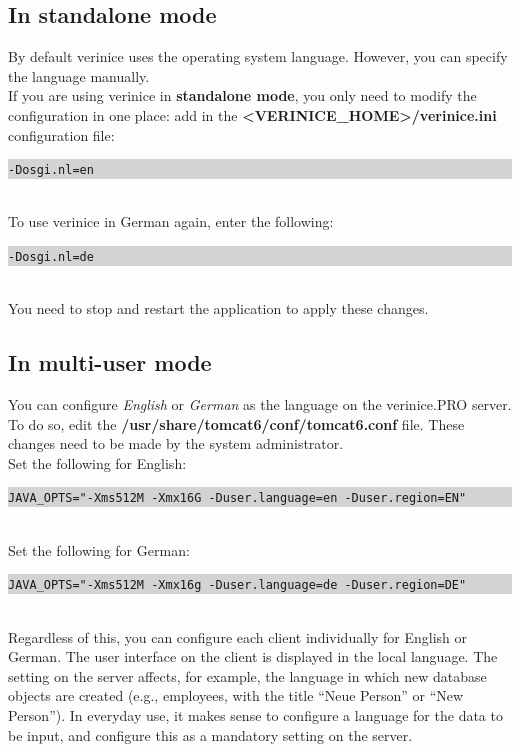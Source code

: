 \documentclass[a4paper,10pt]{book}
\begin{document}
\subsection{In standalone mode}
By default verinice uses the operating system language. However, you can specify the language manually.
\newline\\
If you are using verinice in \textbf{standalone mode}, you only need to modify the configuration in one place:
add in the
\newline \textbf{\textless VERINICE\_HOME\textgreater/verinice.ini} configuration file:
\newline\\
\colorbox{lightgray}{\parbox{\textwidth}{
{\tt -Dosgi.nl=en}
}}
\newline\\
To use verinice in German again, enter the following:
\newline\\
\colorbox{lightgray}{\parbox{\textwidth}{
{\tt -Dosgi.nl=de}
}}
\newline\\
You need to stop and restart the application to apply these changes.

\subsection{In multi-user mode}
You can configure {\em English} or {\em German} as the language on the verinice.\textsc{PRO} server.
To do so, edit the \textbf{/usr/share/tomcat6/conf/tomcat6.conf} file. These changes need to be made by the system administrator.
\newline\\
Set the following for English:
\newline\\
\colorbox{lightgray}{\parbox{\textwidth}{
{\tt JAVA\_OPTS="-Xms512M -Xmx16G -Duser.language=en -Duser.region=EN"}
}}
\newline\\
Set the following for German:
\newline\\
\colorbox{lightgray}{\parbox{\textwidth}{
{\tt JAVA\_OPTS="-Xms512M -Xmx16g -Duser.language=de -Duser.region=DE"}
}}
\newline\\
Regardless of this, you can configure each client individually for English or German.
The user interface on the client is displayed in the local language. The setting on the server affects,
for example, the language in which new database objects are created (e.g., employees, with the title
``Neue Person'' or ``New Person'').
\newline
In everyday use, it makes sense to configure a language for the data to be input, and configure this
as a mandatory setting on the server.
\end{document}

